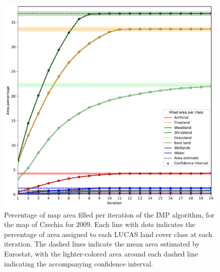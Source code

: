     \begin{figure}[H]
        \centering
        \includegraphics[width=\linewidth]{figs_04/fig6_fill_by_iterations.pdf}
        \caption{Percentage of map area filled per iteration of the IMP algorithm, for the map of Czechia for 2009. Each line with dots indicates the percentage of area assigned to each LUCAS land cover class at each iteration. The dashed lines indicate the mean area estimated by Eurostat, with the lighter-colored area around each dashed line indicating the accompanying confidence interval.}
        \label{fig:fill_by_iterations}
    \end{figure}

